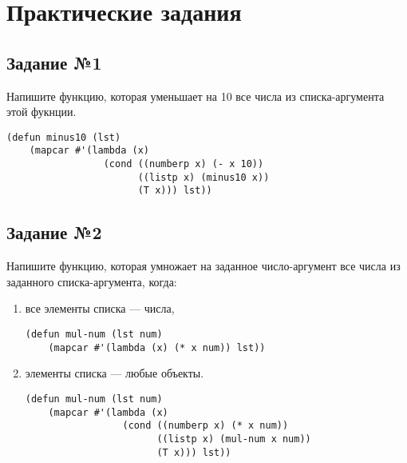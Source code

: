 \chapter{Практические задания}

\section{Задание №1}

Напишите функцию, которая уменьшает на 10 все числа из списка-аргумента этой
фукнции.

\vspace{4mm}
\hfill
\begin{minipage}{0.92\linewidth}
\begin{lstlisting}
(defun minus10 (lst)
    (mapcar #'(lambda (x)
                 (cond ((numberp x) (- x 10))
                       ((listp x) (minus10 x))
                       (T x))) lst))
\end{lstlisting}
\end{minipage}

\section{Задание №2}

Напишите функцию, которая умножает на заданное число-аргумент все числа
из заданного списка-аргумента, когда:

\begin{enumerate}
    \item все элементы списка --- числа,

\vspace{4mm}
\begin{minipage}{0.92\linewidth}
\begin{lstlisting}
(defun mul-num (lst num)
    (mapcar #'(lambda (x) (* x num)) lst))
\end{lstlisting}
\end{minipage}

    \item элементы списка --- любые объекты.

\vspace{4mm}
\begin{minipage}{0.92\linewidth}
\begin{lstlisting}
(defun mul-num (lst num)
    (mapcar #'(lambda (x)
                 (cond ((numberp x) (* x num))
                       ((listp x) (mul-num x num))
                       (T x))) lst))
\end{lstlisting}
\end{minipage}
\end{enumerate}


